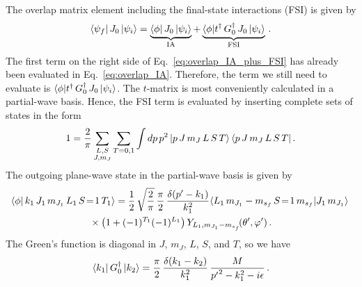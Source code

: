 	The overlap matrix element including the final-state interactions (FSI) is
	given by
	\begin{equation}
	 \langle \psi_f| \, J_0 \,|\psi_i \rangle
	 = \underbrace{\langle \phi| \, J_0 \,|\psi_i \rangle}_{\rm IA}
	 + \underbrace{\langle \phi| t^\dag \, G_0^\dag\, J_0 \,|\psi_i \rangle}_
	 {\rm FSI} \,.
	\label{eq:overlap_IA_plus_FSI}
	\end{equation}
	The first term on the right side of Eq.~\eqref{eq:overlap_IA_plus_FSI}
	has already been evaluated in Eq.~\eqref{eq:overlap_IA}.  Therefore, the term
	we still need to evaluate is $\langle \phi| t^\dag \, G_0^\dag\, J_0
	\,|\psi_i \rangle$.  The $t$-matrix is most conveniently calculated in a
	partial-wave basis.  Hence, the FSI term is evaluated by inserting complete
	sets of states in the form
	\begin{equation}
	 1 = \frac{2}{\pi} \sum_{\substack{L, S \\ J,  m_J }}
	 \sum_{T = 0, 1} \int dp \,p^2 \, |p \, J \, m_J \, L \, S \, T \rangle
	 \, \langle p \, J\, m_J \, L \, S \, T | \,.
	\label{eq:completeness_partial_wave}
	\end{equation}
	The outgoing plane-wave state in the partial-wave basis is given by
	\begin{multline}
	 \la \phi | \, k_1 \, J_1 \, m_{J_1} \, L_1 \, S\!=\!1 \, T_1 \ra
	  =  \frac{1}{2} \, {\sqrt\frac{2}{\pi}} \, \frac{\pi}{2} \,
	 \frac{\delta(\pp - k_1)}{k_1 ^2}
	 \CG{L_1}{m_{J_1} - \msf}{S\!=\!1}{\msf}{J_1}{m_{J_1}}
	 \, \\
	 \null \times \big(1 + (-1)^{T_1} (-1)^{L_1}\big)
	 \,Y_{L_1,m_{J_1} - \msf}\!(\thetacm, \phicm) \,.
	\label{eq:phi_def_pw}
	\end{multline}
	The Green's
	function is diagonal in $J$, $m_J$, $L$, $S$, and $T$, so we have
	\begin{equation}
	 \langle k_1 | \, G_0^\dag \,| k_2 \rangle
	 = \frac{\pi}{2} \, \frac{\delta(k_1 - k_2)}{k_1^2}
	 \, \frac{M}{{p^\prime}^2 - k_1 ^2 - i\epsilon} \,.
	\label{eq:G0_def_pw}
	\end{equation}

